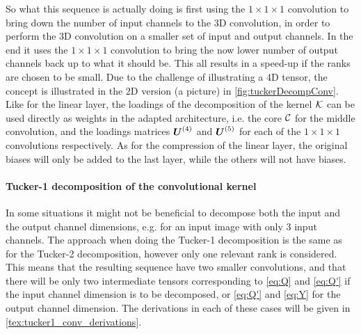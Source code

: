 So what this sequence is actually doing is first using the $1\times 1\times 1$ convolution to bring down the number of input channels to the 3D convolution, in order to perform the 3D convolution on a smaller set of input and output channels. In the end it uses the $1\times 1\times 1$ convolution to bring the now lower number of output channels back up to what it should be. This all results in a speed-up if the ranks are chosen to be small. Due to the challenge of illustrating a 4D tensor, the concept is illustrated in the 2D version (a picture) in \autoref{fig:tuckerDecompConv}. Like for the linear layer, the loadings of the decomposition of the kernel $\mathcal{K}$ can be used directly as weights in the adapted architecture, i.e. the core $\mathcal{C}$ for the middle convolution, and the loadings matrices $\boldsymbol{U}^{(4)}$ and $\boldsymbol{U}^{(5)}$ for each of the $1\times 1\times 1$ convolutions respectively. As for the compression of the linear layer, the original biases will only be added to the last layer, while the others will not have biases.

\paragraph{Tucker-1 decomposition of the convolutional kernel}
In some situations it might not be beneficial to decompose both the input and the output channel dimensions, e.g. for an input image with only 3 input channels. The approach when doing the Tucker-1 decomposition is the same as for the Tucker-2 decomposition, however only one relevant rank is considered. This means that the resulting sequence have two smaller convolutions, and that there will be only two intermediate tensors corresponding to \eqref{eq:Q} and \eqref{eq:Q'} if the input channel dimension is to be decomposed, or \eqref{eq:Q'} and \eqref{eq:Y} for the output channel dimension. The derivations in each of these cases will be given in \autoref{tex:tucker1_conv_derivations}.

